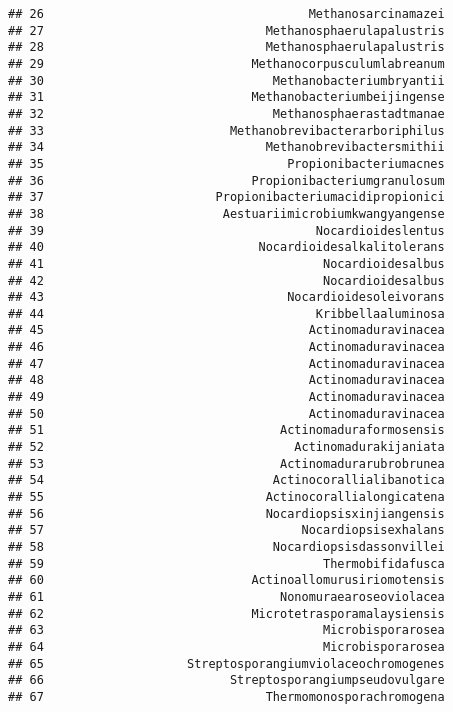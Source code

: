 \documentclass[
]{article}
\begin{document}
\begin{verbatim}
## 26                                     Methanosarcinamazei
## 27                               Methanosphaerulapalustris
## 28                               Methanosphaerulapalustris
## 29                             Methanocorpusculumlabreanum
## 30                                Methanobacteriumbryantii
## 31                             Methanobacteriumbeijingense
## 32                                Methanosphaerastadtmanae
## 33                          Methanobrevibacterarboriphilus
## 34                               Methanobrevibactersmithii
## 35                                  Propionibacteriumacnes
## 36                             Propionibacteriumgranulosum
## 37                        Propionibacteriumacidipropionici
## 38                         Aestuariimicrobiumkwangyangense
## 39                                      Nocardioideslentus
## 40                              Nocardioidesalkalitolerans
## 41                                       Nocardioidesalbus
## 42                                       Nocardioidesalbus
## 43                                  Nocardioidesoleivorans
## 44                                      Kribbellaaluminosa
## 45                                     Actinomaduravinacea
## 46                                     Actinomaduravinacea
## 47                                     Actinomaduravinacea
## 48                                     Actinomaduravinacea
## 49                                     Actinomaduravinacea
## 50                                     Actinomaduravinacea
## 51                                 Actinomaduraformosensis
## 52                                   Actinomadurakijaniata
## 53                                 Actinomadurarubrobrunea
## 54                                Actinocorallialibanotica
## 55                               Actinocorallialongicatena
## 56                               Nocardiopsisxinjiangensis
## 57                                    Nocardiopsisexhalans
## 58                                Nocardiopsisdassonvillei
## 59                                       Thermobifidafusca
## 60                             Actinoallomurusiriomotensis
## 61                                 Nonomuraearoseoviolacea
## 62                             Microtetrasporamalaysiensis
## 63                                       Microbisporarosea
## 64                                       Microbisporarosea
## 65                    Streptosporangiumviolaceochromogenes
## 66                          Streptosporangiumpseudovulgare
## 67                               Thermomonosporachromogena

\end{verbatim}
\end{document}
